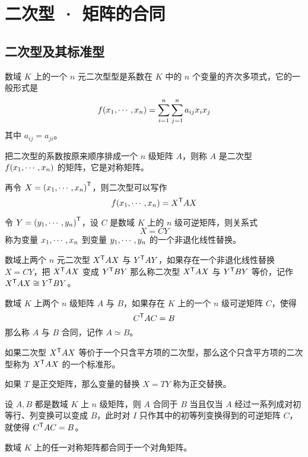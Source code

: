 \chapter{二次型 · 矩阵的合同}

\section{二次型及其标准型}

\begin{definition}
	数域 $K$ 上的一个 $n$ 元二次型型是系数在 $K$ 中的 $n$ 个变量的齐次多项式，它的一般形式是
	\[f(x_1,\cdots,x_n) = \sum_{i=1}^n\sum_{j=1}^na_{ij}x_ix_j\]
	其中 $a_{ij} = a_{ji}$。
\end{definition}

把二次型的系数按原来顺序排成一个 $n$ 级矩阵 $A$，则称 $A$ 是二次型 $f(x_1,\cdots,x_n)$ 的矩阵，它是对称矩阵。

再令 $X = {(x_1,\cdots,x_n)}^\mathsf{T}$，则二次型可以写作
\[f(x_1,\cdots,x_n) = {X}^\mathsf{T}AX\]

令 $Y = {(y_1,\cdots,y_n)}^\mathsf{T}$，设 $C$ 是数域 $K$ 上的 $n$ 级可逆矩阵，则关系式
\[X = CY\]
称为变量 $x_1,\cdots,x_n$ 到变量 $y_1,\cdots,y_n$ 的一个非退化线性替换。

\begin{definition}
	数域上两个 $n$ 元二次型 ${X}^\mathsf{T}AX$ 与 ${Y}^\mathsf{T}AY$，如果存在一个非退化线性替换 $X = CY$，把 ${X}^\mathsf{T}AX$ 变成 ${Y}^\mathsf{T}BY$ 那么称二次型 ${X}^\mathsf{T}AX$ 与 ${Y}^\mathsf{T}BY$ 等价，记作 ${X}^\mathsf{T}AX \cong {Y}^\mathsf{T}BY$。
\end{definition}

\begin{definition}
	数域 $K$ 上两个 $n$ 级矩阵 $A$ 与 $B$，如果存在 $K$ 上的一个 $n$ 级可逆矩阵 $C$，使得
	\[{C}^\mathsf{T}AC = B\]
	那么称 $A$ 与 $B$ 合同，记作 $A\simeq B$。
\end{definition}

如果二次型 ${X}^\mathsf{T} A X$ 等价于一个只含平方项的二次型，那么这个只含平方项的二次型称为 ${X}^\mathsf{T}AX$ 的一个标准形。

如果 $T$ 是正交矩阵，那么变量的替换 $X = TY$ 称为正交替换。

\begin{theorem}
	设 $A,B$ 都是数域 $K$ 上 $n$ 级矩阵，则 $A$ 合同于 $B$ 当且仅当 $A$ 经过一系列成对初等行、列变换可以变成 $B$，此时对 $I$ 只作其中的初等列变换得到的可逆矩阵 $C$，就使得 ${C}^\mathsf{T}AC=B$。
\end{theorem}

\begin{theorem}
	数域 $K$ 上的任一对称矩阵都合同于一个对角矩阵。
\end{theorem}

